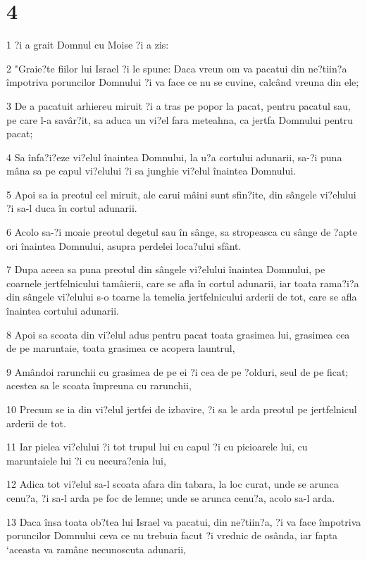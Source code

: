 \chapter{4}

\par 1 ?i a grait Domnul cu Moise ?i a zis:
\par 2 "Graie?te fiilor lui Israel ?i le spune: Daca vreun om va pacatui din ne?tiin?a împotriva poruncilor Domnului ?i va face ce nu se cuvine, calcând vreuna din ele;
\par 3 De a pacatuit arhiereu miruit ?i a tras pe popor la pacat, pentru pacatul sau, pe care l-a savâr?it, sa aduca un vi?el fara meteahna, ca jertfa Domnului pentru pacat;
\par 4 Sa înfa?i?eze vi?elul înaintea Domnului, la u?a cortului adunarii, sa-?i puna mâna sa pe capul vi?elului ?i sa junghie vi?elul înaintea Domnului.
\par 5 Apoi sa ia preotul cel miruit, ale carui mâini sunt sfin?ite, din sângele vi?elului ?i sa-l duca în cortul adunarii.
\par 6 Acolo sa-?i moaie preotul degetul sau în sânge, sa stropeasca cu sânge de ?apte ori înaintea Domnului, asupra perdelei loca?ului sfânt.
\par 7 Dupa aceea sa puna preotul din sângele vi?elului înaintea Domnului, pe coarnele jertfelnicului tamâierii, care se afla în cortul adunarii, iar toata rama?i?a din sângele vi?elului s-o toarne la temelia jertfelnicului arderii de tot, care se afla înaintea cortului adunarii.
\par 8 Apoi sa scoata din vi?elul adus pentru pacat toata grasimea lui, grasimea cea de pe maruntaie, toata grasimea ce acopera launtrul,
\par 9 Amândoi rarunchii cu grasimea de pe ei ?i cea de pe ?olduri, seul de pe ficat; acestea sa le scoata împreuna cu rarunchii,
\par 10 Precum se ia din vi?elul jertfei de izbavire, ?i sa le arda preotul pe jertfelnicul arderii de tot.
\par 11 Iar pielea vi?elului ?i tot trupul lui cu capul ?i cu picioarele lui, cu maruntaiele lui ?i cu necura?enia lui,
\par 12 Adica tot vi?elul sa-l scoata afara din tabara, la loc curat, unde se arunca cenu?a, ?i sa-l arda pe foc de lemne; unde se arunca cenu?a, acolo sa-l arda.
\par 13 Daca însa toata ob?tea lui Israel va pacatui, din ne?tiin?a, ?i va face împotriva poruncilor Domnului ceva ce nu trebuia facut ?i vrednic de osânda, iar fapta `aceasta va ramâne necunoscuta adunarii,
